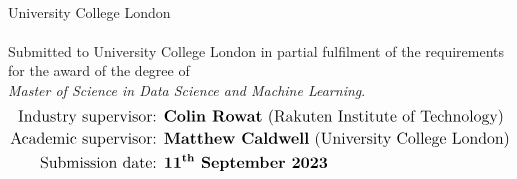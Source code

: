 \begin{singlespace}
    \begin{titlepage}
    	
    	
        \centering
		\vspace*{-3.75cm}
		 \vspace{1cm}

        { \begin{spacing}{1.35}
        \end{spacing} }
    
    	\vspace{0.5cm}        
		

        \LARGE \textbf{{\authorName}}\\
        {\Large University College London}\\
        {\Large \department}\\[2cm]

        {\large Submitted to University College London in partial fulfilment of the requirements for the award of the degree of \\ \textit{Master of Science in Data Science and Machine Learning}.}\\[0.5cm]

        \begin{align*}
        	\text{\large Industry supervisor: } & \text{\large \textbf{Colin Rowat} (Rakuten Institute of Technology)} \\
        	\text{\large Academic supervisor: } & \text{\large \textbf{Matthew Caldwell} (University College London)} \\
        	\text{\large Submission date: } & \text{\large \textbf{\textbf{11\textsuperscript{th} September 2023}}}
        \end{align*}\\[2cm]
        

\end{titlepage}
\end{singlespace}
